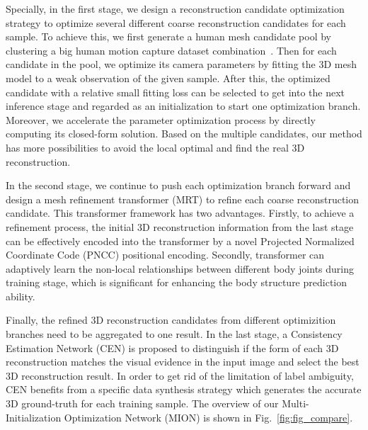 \documentclass[sigconf]{acmart}
\begin{document}
Specially, in the first stage, we design a reconstruction candidate optimization strategy to optimize 
several different coarse reconstruction candidates for each sample. To achieve this, we first generate a 
human mesh candidate pool by clustering a big human motion capture dataset combination~\cite{mahmood2019amass}. 
Then for each candidate in the pool, we optimize its camera parameters by fitting the 3D mesh model to a 
weak observation of the given sample. After this, the optimized candidate with  
a relative small fitting loss can be selected to get into the next inference stage and regarded as an initialization 
to start one optimization branch. Moreover, we accelerate the parameter optimization process by directly computing its 
closed-form solution. Based on the multiple candidates, our method has more possibilities to avoid the local optimal 
and find the real 3D reconstruction. 

In the second stage, we continue to push each optimization branch forward and 
design a mesh refinement transformer (MRT) to refine each coarse reconstruction candidate. 
This transformer framework has two advantages. Firstly, to achieve a refinement process, 
the initial 3D reconstruction information from the last stage can be effectively encoded into 
the transformer by a novel Projected Normalized Coordinate Code (PNCC) positional encoding. 
Secondly, transformer can adaptively learn the non-local relationships between different body 
joints during training stage, which is significant for enhancing the body structure prediction ability.


Finally, the refined 3D reconstruction candidates from different optimizition branches need to be aggregated to 
one result. In the last stage, a Consistency Estimation Network (CEN) is proposed to 
distinguish if the form of each 3D reconstruction matches the visual evidence in the input image 
and select the best 3D reconstruction result. 
In order to get rid of the limitation of label ambiguity, CEN benefits from 
a specific data synthesis strategy which generates the accurate 3D ground-truth for each training sample. 
The overview of our Multi-Initialization Optimization Network (MION) is shown in Fig.~\ref{fig:fig_compare}.
\end{document}
